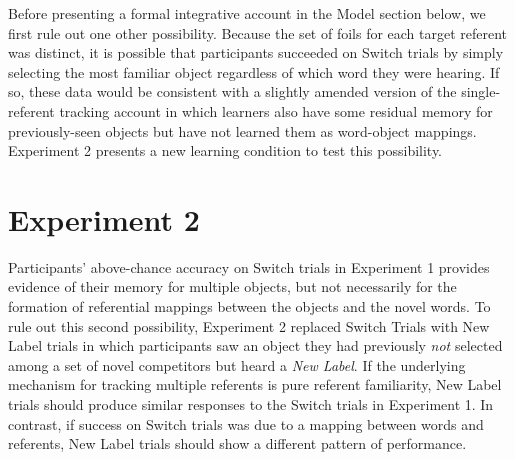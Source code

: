 \documentclass[man,floatsintext]{apa6}
\begin{document}

\newpage

Before presenting a formal integrative account in the Model section below, we first rule out one other possibility. Because the set of foils for each target referent was distinct, it is possible that participants succeeded on Switch trials by simply selecting the most familiar object regardless of which word they were hearing. If so, these data would be consistent with a slightly amended version of the single-referent tracking account in which learners also have some residual memory for previously-seen objects but have not learned them as word-object mappings. Experiment 2 presents a new learning condition to test this possibility.


\vspace{-12 pt}

\section{Experiment 2}

Participants' above-chance accuracy on Switch trials in Experiment 1 provides evidence of their memory for multiple objects, but not necessarily for the formation of referential mappings between the objects and the novel words. To rule out this second possibility, Experiment 2 replaced Switch Trials with New Label trials in which participants saw an object they had previously \emph{not} selected among a set of novel competitors but heard a \emph{New Label}. If the underlying mechanism for tracking multiple referents is pure referent familiarity, New Label trials should produce similar responses to the Switch trials in Experiment 1. In contrast, if success on Switch trials was due to a mapping between words and referents, New Label trials should show a different pattern of performance.
\end{document}
